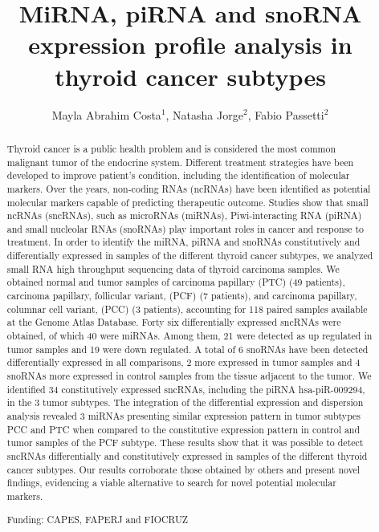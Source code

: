 \documentclass[twoside]{article}
\title{\vspace{-15mm}\fontsize{24pt}{10pt}\selectfont\textbf{MiRNA, piRNA and snoRNA expression profile analysis in thyroid cancer subtypes}} %
\author{Mayla Abrahim Costa$^1$, Natasha Jorge$^2$, Fabio Passetti$^2$}
\affil{1 IOC/FIOCRUZ - RJ\\ 2 FIOCRUZ - IOC\\ }
\date{}
\begin{document}
\maketitle %

\thispagestyle{fancy} %


\begin{abstract}
Thyroid cancer is a public health problem and is considered the most common malignant tumor of the endocrine system. Different treatment strategies have been developed to improve patient's condition, including the identification of molecular markers. Over the years, non-coding RNAs (ncRNAs) have been identified as potential molecular markers capable of predicting therapeutic outcome. Studies show that small ncRNAs (sncRNAs), such as microRNAs (miRNAs), Piwi-interacting RNA (piRNA) and small nucleolar RNAs (snoRNAs) play important roles in cancer and response to treatment. In order to identify the miRNA, piRNA and snoRNAs constitutively and differentially expressed in samples of the different thyroid cancer subtypes, we analyzed small RNA high throughput sequencing data of thyroid carcinoma samples. We obtained normal and tumor samples of carcinoma papillary (PTC) (49 patients), carcinoma papillary, follicular variant, (PCF) (7 patients), and carcinoma papillary, columnar cell variant, (PCC) (3 patients), accounting for 118 paired samples available at the Genome Atlas Database. Forty six differentially expressed sncRNAs were obtained, of which 40 were miRNAs. Among them, 21 were detected as up regulated in tumor samples and 19 were down regulated. A total of 6 snoRNAs have been detected differentially expressed in all comparisons, 2 more expressed in tumor samples and 4 snoRNAs more expressed in control samples from the tissue adjacent to the tumor. We identified 34 constitutively expressed sncRNAs, including the piRNA hsa-piR-009294, in the 3 tumor subtypes. The integration of the differential expression and dispersion analysis revealed 3 miRNAs presenting similar expression pattern in tumor subtypes PCC and PTC when compared to the constitutive expression pattern in control and tumor samples of the PCF subtype. These results show that it was possible to detect sncRNAs differentially and constitutively expressed in samples of the different thyroid cancer subtypes. Our results corroborate those obtained by others and present novel findings, evidencing a viable alternative to search for novel potential molecular markers.

Funding: CAPES, FAPERJ and FIOCRUZ
\end{abstract}
\end{document}
